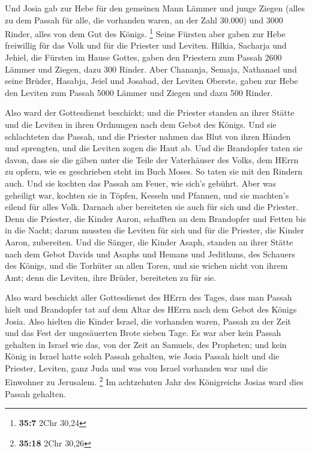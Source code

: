  Und Josia gab zur Hebe für den gemeinen Mann Lämmer und
junge Ziegen (alles zu dem Passah für alle, die vorhanden waren, an der
Zahl 30.000) und 3000 Rinder, alles von dem Gut des Königs. \footnote{\textbf{35:7}
  2Chr 30,24}  Seine Fürsten aber gaben zur Hebe
freiwillig für das Volk und für die Priester und Leviten. Hilkia,
Sacharja und Jehiel, die Fürsten im Hause Gottes, gaben den Priestern
zum Passah 2600 Lämmer und Ziegen, dazu 300 Rinder.  Aber
Chananja, Semaja, Nathanael und seine Brüder, Hasabja, Jeiel und
Josabad, der Leviten Oberste, gaben zur Hebe den Leviten zum Passah 5000
Lämmer und Ziegen und dazu 500 Rinder.

 Also ward der Gottesdienst beschickt; und die Priester
standen an ihrer Stätte und die Leviten in ihren Ordnungen nach dem
Gebot des Königs.  Und sie schlachteten das Passah, und
die Priester nahmen das Blut von ihren Händen und sprengten, und die
Leviten zogen die Haut ab.  Und die Brandopfer taten sie
davon, dass sie die gäben unter die Teile der Vaterhäuser des Volks, dem
HErrn zu opfern, wie es geschrieben steht im Buch Moses. So taten sie
mit den Rindern auch.  Und sie kochten das Passah am
Feuer, wie sich's gebührt. Aber was geheiligt war, kochten sie in
Töpfen, Kesseln und Pfannen, und sie machten's eilend für alles Volk.
 Darnach aber bereiteten sie auch für sich und die
Priester. Denn die Priester, die Kinder Aaron, schafften an dem
Brandopfer und Fetten bis in die Nacht; darum mussten die Leviten für
sich und für die Priester, die Kinder Aaron, zubereiten. 
Und die Sänger, die Kinder Asaph, standen an ihrer Stätte nach dem Gebot
Davids und Asaphs und Hemans und Jedithuns, des Schauers des Königs, und
die Torhüter an allen Toren, und sie wichen nicht von ihrem Amt; denn
die Leviten, ihre Brüder, bereiteten zu für sie.

 Also ward beschickt aller Gottesdienst des HErrn des
Tages, dass man Passah hielt und Brandopfer tat auf dem Altar des HErrn
nach dem Gebot des Königs Josia.  Also hielten die Kinder
Israel, die vorhanden waren, Passah zu der Zeit und das Fest der
ungesäuerten Brote sieben Tage.  Es war aber kein Passah
gehalten in Israel wie das, von der Zeit an Samuels, des Propheten; und
kein König in Israel hatte solch Passah gehalten, wie Josia Passah hielt
und die Priester, Leviten, ganz Juda und was von Israel vorhanden war
und die Einwohner zu Jerusalem. \footnote{\textbf{35:18} 2Chr 30,26}
 Im achtzehnten Jahr des Königreichs Josias ward dies
Passah gehalten.

